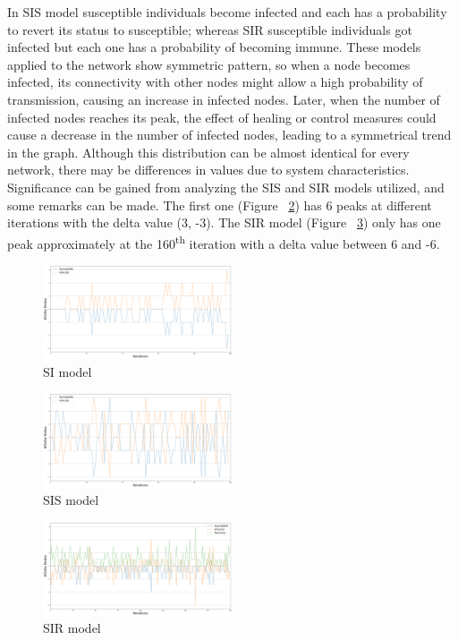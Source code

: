 \documentclass[sigchi]{acmart}
\begin{document}
In SIS model susceptible individuals become infected and each has a probability to revert its status to susceptible; whereas SIR susceptible individuals got infected but each one has a probability of becoming immune. 
These models applied to the network show symmetric pattern, so when a node becomes infected, its connectivity with other nodes might allow a high probability of transmission, causing an increase in infected nodes. Later, when the number of infected nodes reaches its peak, the effect of healing or control measures could cause a decrease in the number of infected nodes, leading to a symmetrical trend in the graph.
Although this distribution can be almost identical for every network, there may be differences in values due to system characteristics. Significance can be gained from analyzing the SIS and SIR models utilized, and some remarks can be made. The first one (Figure ~\ref{fig:immagine_sis}) has 6 peaks at different iterations with the delta value (3, -3). The SIR model (Figure ~\ref{fig:immagine_sir}) only has one peak approximately at the 160\textsuperscript{th} iteration with a delta value between 6 and -6.

\begin{figure}[H]
  \centering
  \includegraphics[width=0.50\textwidth]{si.png}
  \caption{SI model}
  \label{fig:immagine}
\end{figure}
\begin{figure}[H]
  \centering
  \includegraphics[width=0.50\textwidth]{sis.png}
  \caption{SIS model}
  \label{fig:immagine_sis}
\end{figure}

\begin{figure}[H]
  \centering
  \includegraphics[width=0.50\textwidth]{SIR.png}
  \caption{SIR model}
  \label{fig:immagine_sir}
\end{figure}
\end{document}
